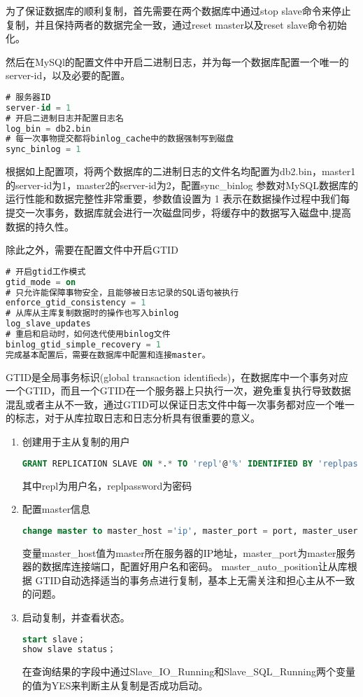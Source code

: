 为了保证数据库的顺利复制，首先需要在两个数据库中通过stop slave命令来停止复制，并且保持两者的数据完全一致，通过reset master以及reset slave命令初始化。

然后在MySQl的配置文件中开启二进制日志，并为每一个数据库配置一个唯一的server-id，以及必要的配置。
\begin{lstlisting}[language=sql,numbers=none]
# 服务器ID
server-id = 1
# 开启二进制日志并配置日志名
log_bin = db2.bin
# 每一次事物提交都将binlog_cache中的数据强制写到磁盘
sync_binlog = 1
\end{lstlisting}
根据如上配置项，将两个数据库的二进制日志的文件名均配置为db2.bin，master1的server-id为1，master2的server-id为2，配置sync\_binlog 参数对MySQL数据库的运行性能和数据完整性非常重要，参数值设置为 1 表示在数据操作过程中我们每提交一次事务，数据库就会进行一次磁盘同步，将缓存中的数据写入磁盘中,提高数据的持久性。

除此之外，需要在配置文件中开启GTID
\begin{lstlisting}[language=sql,numbers=none]
# 开启gtid工作模式
gtid_mode = on
# 只允许能保障事物安全，且能够被日志记录的SQL语句被执行
enforce_gtid_consistency = 1
# 从库从主库复制数据时的操作也写入binlog
log_slave_updates
# 重启和启动时，如何迭代使用binlog文件
binlog_gtid_simple_recovery = 1
完成基本配置后，需要在数据库中配置和连接master。
\end{lstlisting}
GTID是全局事务标识(global transaction identifieds)，在数据库中一个事务对应一个GTID，而且一个GTID在一个服务器上只执行一次，避免重复执行导致数据混乱或者主从不一致，通过GTID可以保证日志文件中每一次事务都对应一个唯一的标志，对于从库拉取日志和日志分析具有很重要的意义。
\begin{enumerate}
\item 创建用于主从复制的用户
\begin{lstlisting}[language=sql,numbers=none]
GRANT REPLICATION SLAVE ON *.* TO 'repl'@'%' IDENTIFIED BY 'replpassword';
\end{lstlisting}
其中repl为用户名，replpassword为密码
\item 配置master信息
\begin{lstlisting}[language=sql,numbers=none]
change master to master_host ='ip', master_port = port, master_user = 'repl', master_password = 'replpassword', master_auto_position =1;
\end{lstlisting}
变量master\_host值为master所在服务器的IP地址，master\_port为master服务器的数据库连接端口，配置好用户名和密码。
master\_auto\_position让从库根据 GTID自动选择适当的事务点进行复制，基本上无需关注和担心主从不一致的问题。
\item 启动复制，并查看状态。
\begin{lstlisting}[language=sql,numbers=none]
start slave；
show slave status；
\end{lstlisting}
在查询结果的字段中通过Slave\_IO\_Running和Slave\_SQL\_Running两个变量的值为YES来判断主从复制是否成功启动。
\end{enumerate}

